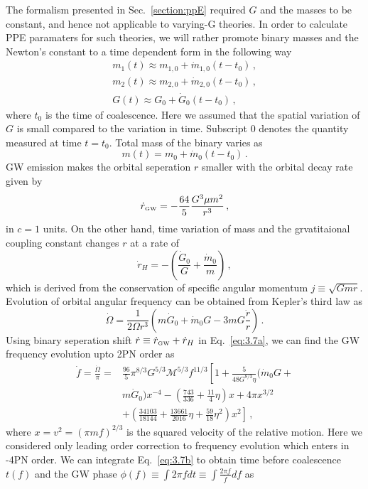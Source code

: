 \documentclass[prd,twocolumn,nofootinbib]{revtex4-1}
\newcommand{\GW}{{\mbox{\tiny GW}}}
\begin{document}
The formalism presented in Sec.~\ref{section:ppE} required $G$ and the masses to be constant, and hence not applicable to varying-G theories. In order to calculate PPE paramaters for such theories, we will rather promote binary masses and the Newton's constant to a time dependent form in the following way
 \begin{eqnarray}\label{eq:3.7a2}
 m_1(t)\approx m_{1,0}+\dot{m}_{1,0}(t-t_0)\,, \\
 \label{eq:3.7a3}  m_2(t)\approx m_{2,0}+\dot{m}_{2,0}(t-t_0)\,, \\
   \label{eq:3.7a4}  G(t)\approx  G_0+\dot{G}_0(t-t_0)\, , 
 \end{eqnarray}
where $t_0$ is the time of coalescence. Here we assumed that the spatial variation of $G$ is small compared to the variation in time. Subscript $0$ denotes the quantity measured at time $t=t_0$. Total mass of the binary varies as
 \begin{equation}
 m(t)=m_0+\dot{m}_0(t-t_0)\,.
 \end{equation}
 GW emission makes the orbital seperation $r$ smaller with the orbital decay rate given by~\cite{PhysRevD.49.2658}
 \begin{equation}
 \dot{r}_{\GW}=-\frac{64}{5}\frac{G^3 \mu m^2}{r^3}\,,
 \end{equation}
 in $c=1$ units. On the other hand, time variation of mass and the grvatitaional coupling constant changes $r$ at a rate of 
 \begin{equation}
 \dot{r}_H=-\left(\frac{\dot{G}_0}{G}+\frac{\dot{m}_0}{m}\right)\,,
 \end{equation}
 which is derived from the conservation of specific angular momentum $j\equiv\sqrt{Gmr}$. Evolution of orbital angular frequency can be obtained from Kepler's third law as
 \begin{equation}\label{eq:3.7a}
 \dot{\Omega}=\frac{1}{2\Omega r^3}\left(m\dot{G}_0+\dot{m}_0G-3mG\frac{\dot{r}}{r}\right)\,.
 \end{equation}
Using binary seperation shift $\dot{r}\equiv \dot{r}_{\GW}+\dot{r}_H$ in Eq.~\eqref{eq:3.7a}, we can find the GW frequency evolution upto 2PN order as
\begin{align} \label{eq:3.7b}
 \dot{f}=\frac{\dot{\Omega}}{\pi}=& \frac{96}{5}\pi^{8/3}G^{5/3}\mathcal{M}^{5/3}f^{11/3}\left[1+\frac{5}{48 G^{8/3}\eta}(\dot{m}_0G+ \right.\nonumber\\ & \left. m\dot{G}_0)x^{-4} -\left(\frac{743}{336}+\frac{11}{4}\eta\right)x+4\pi x^{3/2}\right.\nonumber\\ & \left. + \left(\frac{34103}{18144}+\frac{13661}{2016}\eta+\frac{59}{18}\eta^2\right)x^2 \right]\,,
\end{align}
where $x=v^2=(\pi m f)^{2/3}$ is the squared velocity of the relative motion. Here we considered only leading order correction to frequency evolution which enters in -4PN order. We can integrate Eq.~\eqref{eq:3.7b} to obtain time before coalescence $t(f)$ and the GW phase $\phi(f)\equiv \int 2 \pi f dt \equiv \int\frac{2\pi f}{\dot{f}}df$ as
\end{document}
